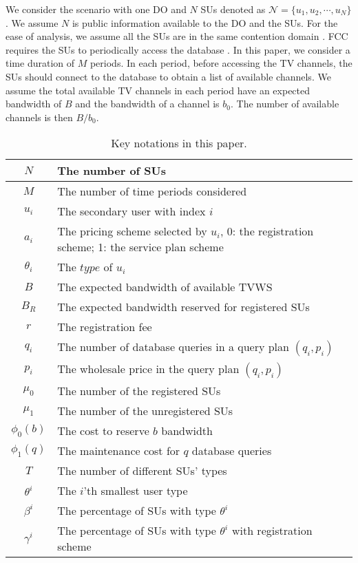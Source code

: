\documentclass[journal]{IEEEtran}
\begin{document}
We consider the scenario with one DO and $N$ SUs denoted as $\mathcal{N}=\{u_1, u_2, \cdots, u_N\}$. We assume $N$ is public information available to the DO and the SUs. For the ease of analysis, we assume all the SUs are in the same contention domain \cite{contention_domain}. FCC requires the SUs to periodically access the database \cite{FCCrule10}. In this paper, we consider a time duration of $M$ periods. In each period, before accessing the TV channels, the SUs should connect to the database to obtain a list of available channels. We assume the total available TV channels in each period have an expected bandwidth of $B$ and the bandwidth of a channel is $b_0$. The number of available channels is then $B/b_0$.

\begin{table}[tp]
\renewcommand{\arraystretch}{1.0}
\caption{Key notations in this paper.}
\label{tab:Notations}
\centering
\begin{tabular}{|c|p{2.8in}|}
  \hline
$N$ & The number of SUs\\
  \hline
  $M$ & The number of time periods considered\\
  \hline
  $u_i$ & The secondary user with index $i$\\
  \hline
  $a_i$ & The pricing scheme selected by $u_i$, 0: the registration scheme; 1: the service plan scheme\\
  \hline
  $\theta_i$ & The $type$ of $u_i$\\
  \hline
  $B$ & The expected bandwidth of available TVWS\\
  \hline
  $B_R$ & The expected bandwidth reserved for registered SUs\\
  \hline
  $r$ & The registration fee\\
  \hline
  $q_i$ & The number of database queries in a query plan $(q_i, p_i)$\\
  \hline
  $p_i$ & The wholesale price in the query plan $(q_i, p_i)$\\
  \hline
  $\mu_0$ & The number of the registered SUs\\
  \hline
  $\mu_1$ & The number of the unregistered SUs\\
  \hline
  $\phi_0(b)$ & The cost to reserve $b$ bandwidth\\
  \hline
  $\phi_1(q)$ & The maintenance cost for $q$ database queries\\
  \hline
  $T$ & The number of different SUs' types\\
  \hline
  $\theta^i$ & The $i$'th smallest user type\\
  \hline
  $\beta^i$ & The percentage of SUs with type $\theta^i$\\
  \hline
  $\gamma^i$ & The percentage of SUs with type $\theta^i$ with registration scheme\\
  \hline
\end{tabular}
\end{table}
\end{document}
